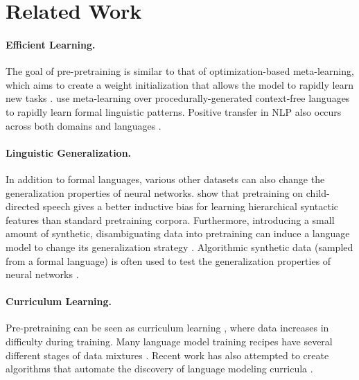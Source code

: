 \section{Related Work}
\paragraph{Efficient Learning.} The goal of pre-pretraining is similar to that of optimization-based meta-learning, which aims to create a weight initialization that allows the model to rapidly learn new tasks \cite{maml,fomaml}. \citet{mccoy2023modelingrapidlanguagelearning} use meta-learning over procedurally-generated context-free languages to rapidly learn formal linguistic patterns. Positive transfer in NLP also occurs across both domains and languages \citep{ruder-etal-2019-transfer,pruksachatkun-etal-2020-intermediate,deshpande-etal-2022-bert}. 

\paragraph{Linguistic Generalization.} In addition to formal languages, various other datasets can also change the generalization properties of neural networks. \citet{mueller-linzen-2023-plant} show that pretraining on child-directed speech gives a better inductive bias for learning hierarchical syntactic features than standard pretraining corpora. Furthermore, introducing a small amount of synthetic, disambiguating data into pretraining can induce a language model to change its generalization strategy \cite{warstadt-etal-2020-learning}. Algorithmic synthetic data (sampled from a formal language) is often used to test the generalization properties of neural networks \cite{mccoy-etal-2019-right,kim-linzen-2020-cogs,li-etal-2023-slog}.

\paragraph{Curriculum Learning.} Pre-pretraining can be seen as curriculum learning \citep{bengio2009curriculum}, where data increases in difficulty during training. Many language model training recipes have several different stages of data mixtures \cite{smollm2,2olmo2furious,instructgpt}. Recent work has also attempted to create algorithms that automate the discovery of language modeling curricula \cite{chen2025aioli,jiang2025adaptive}.